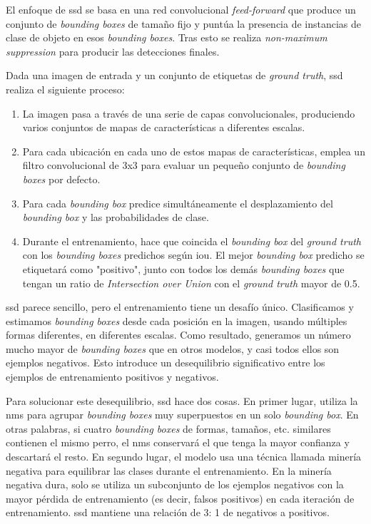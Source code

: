 El enfoque de \acrshort{ssd} se basa en una red convolucional \textit{feed-forward} que produce un conjunto de \textit{bounding boxes} de tamaño fijo y puntúa la presencia de instancias de clase de objeto en esos \textit{bounding boxes}. Tras esto se realiza \textit{non-maximum suppression} para producir las detecciones finales. 

Dada una imagen de entrada y un conjunto de etiquetas de \textit{ground truth}, \acrshort{ssd} realiza el siguiente proceso:
\begin{enumerate}
\item La imagen pasa a través de una serie de capas convolucionales, produciendo varios conjuntos de mapas de características a diferentes escalas.
\item Para cada ubicación en cada uno de estos mapas de características, emplea un filtro convolucional de 3x3 para evaluar un pequeño conjunto de \textit{bounding boxes} por defecto.
\item Para cada \textit{bounding box} predice simultáneamente el desplazamiento del \textit{bounding box} y las probabilidades de clase.
\item Durante el entrenamiento, hace que coincida el \textit{bounding box} del \textit{ground truth} con los \textit{bounding boxes} predichos según \acrfull{iou}. El mejor \textit{bounding box} predicho se etiquetará como "positivo", junto con todos los demás \textit{bounding boxes} que tengan un ratio de \textit{Intersection over Union} con el \textit{ground truth} mayor de 0.5.
\end{enumerate}

\acrshort{ssd} parece sencillo, pero el entrenamiento tiene un desafío único. Clasificamos y estimamos \textit{bounding boxes} desde cada posición en la imagen, usando múltiples formas diferentes, en diferentes escalas. Como resultado, generamos un número mucho mayor de \textit{bounding boxes} que en otros modelos, y casi todos ellos son ejemplos negativos. Esto introduce un desequilibrio significativo entre los ejemplos de entrenamiento positivos y negativos.

Para solucionar este desequilibrio, \acrshort{ssd} hace dos cosas. En primer lugar, utiliza la \acrfull{nms} para agrupar \textit{bounding boxes} muy superpuestos en un solo \textit{bounding box}. En otras palabras, si cuatro \textit{bounding boxes} de formas, tamaños, etc. similares contienen el mismo perro, el \acrshort{nms} conservará el que tenga la mayor confianza y descartará el resto. En segundo lugar, el modelo usa una técnica llamada minería negativa para equilibrar las clases durante el entrenamiento. En la minería negativa dura, solo se utiliza un subconjunto de los ejemplos negativos con la mayor pérdida de entrenamiento (es decir, falsos positivos) en cada iteración de entrenamiento. \acrshort{ssd} mantiene una relación de 3: 1 de negativos a positivos.


